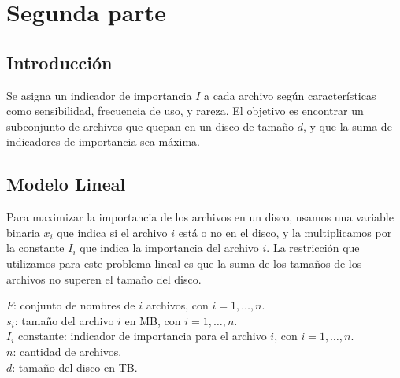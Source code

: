 \documentclass[11pt, a4paper, pdftex]{article}
\begin{document}
%

%

%



\newpage
\section{Segunda parte}

\subsection{Introducción}

Se asigna un indicador de importancia $I$ a cada archivo según
características como sensibilidad, frecuencia de uso, y rareza. El
objetivo es encontrar un subconjunto de archivos que quepan en un disco
de tamaño $d$, y que la suma de indicadores de importancia sea máxima.

\subsection{Modelo Lineal}

Para maximizar la importancia de los archivos en un disco, usamos una
variable binaria $x_i$ que indica si el archivo $i$ está o no en el
disco, y la multiplicamos por la constante $I_{i}$ que indica la
importancia del archivo $i$. La restricción que utilizamos para este
problema lineal es que la suma de los tamaños de los archivos no superen
el tamaño del disco. 

$F$: conjunto de nombres de $i$ archivos, con $i = 1, \ldots, n$. \\

$s_{i}$: tamaño del archivo $i$ en MB, con $i = 1, \ldots, n$. \\

$I_i$ constante: indicador de importancia para el archivo $i$, con $i = 1, \ldots, n$. \\

$n$: cantidad de archivos. \\

$d$: tamaño del disco en TB. \\ 
\end{document}
